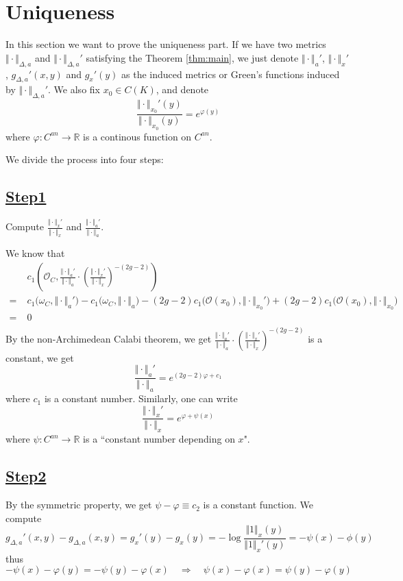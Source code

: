 \documentclass[reqno,11pt]{amsart}
\numberwithin{equation}{section}
\theoremstyle{plain}
\theoremstyle{plain}
\numberwithin{equation}{section}
\theoremstyle{remark}
\newcommand{\norm}[1]{\Vert{#1}\Vert}
\begin{document}
\section{Uniqueness}
In this section we want to prove the uniqueness part. If we have two metrics $\norm{\cdot}_{\Delta,a}$ and $\norm{\cdot}_{\Delta,a}'$ satisfying the Theorem \ref{thm:main}, we just denote $\norm{\cdot}_a'$, $\norm{\cdot}_x'$, $g_{\Delta,a}'(x,y)$ and $g_x'(y)$ as the induced metrics or Green's functions induced by $\norm{\cdot}_{\Delta,a}'$. We also fix $x_0 \in C(K)$, and denote 
$$\frac{\norm{\cdot}_{x_0}'(y)}{\norm{\cdot}_{x_0}(y)}=e^{\varphi(y)}$$
where $\varphi:C^{an} \longrightarrow \mathbb{R}$ is a continous function on $C^{an}$.

We divide the process into four steps:
\subsection*{\underline{Step1}}
Compute $\displaystyle\frac{\norm{\cdot}_x'}{\norm{\cdot}_x}$ and $\displaystyle \frac{\norm{\cdot}_a'}{\norm{\cdot}_a}$.

We know that 
\begin{equation*}
\begin{aligned}
&c_1\left(\mathcal{O}_C,\frac{\norm{\cdot}_a'}{\norm{\cdot}_a} \cdot \left(\frac{\norm{\cdot}_x'}{\norm{\cdot}_x} \right)^{-(2g-2)}\right)\\
  =\;&c_1\Big(\omega_C,\norm{\cdot}_a'\Big)-c_1\Big(\omega_C,\norm{\cdot}_a\Big)-(2g-2)c_1\Big(\mathcal{O}(x_0),\norm{\cdot}_{x_0}'\Big)+ (2g-2)c_1\Big(\mathcal{O}(x_0),\norm{\cdot}_{x_0}\Big) \\
    =\;& 0  \\ 
\end{aligned}
\end{equation*}
By the non-Archimedean Calabi theorem, we get $\displaystyle \frac{\norm{\cdot}_a'}{\norm{\cdot}_a} \cdot \left(\frac{\norm{\cdot}_x'}{\norm{\cdot}_x} \right)^{-(2g-2)}$ is a constant, we get
$$\frac{\norm{\cdot}_a'}{\norm{\cdot}_a}=e^{(2g-2)\varphi+c_1}$$
where $c_1$ is a constant number. Similarly, one can write
$$\frac{\norm{\cdot}_x'}{\norm{\cdot}_x}=e^{\varphi+\psi(x)}$$
where $\psi:C^{an} \longrightarrow \mathbb{R}$ is a ``constant number depending on $x$".
\subsection*{\underline{Step2}}
By the symmetric property, we get $\psi-\varphi\equiv c_2$ is a constant function. We compute
$$
  g_{\Delta,a}'(x,y)-g_{\Delta,a}(x,y)= g_x'(y)-g_x(y)   =-\log \frac{\norm{1}_x(y)}{\norm{1}_x'(y)}=-\psi(x)-\phi(y)
$$
thus
$$-\psi(x)-\varphi(y)=-\psi(y)-\varphi(x) \quad\Longrightarrow\quad \psi(x)-\varphi(x)=\psi(y)-\varphi(y)$$
\end{document}
